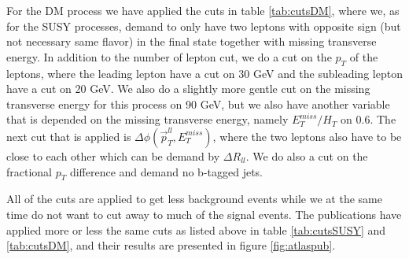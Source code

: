 For the DM process we have applied the cuts in table \ref{tab:cutsDM}, where we, as for the SUSY processes, demand to only have two leptons with opposite sign (but not necessary same flavor) in the final state together with missing transverse energy. In addition to the number of lepton cut, we do a cut on the $p_T$ of the leptons, where the leading lepton have a cut on 30 GeV and the subleading lepton have a cut on 20 GeV. We also do a slightly more gentle cut on the missing transverse energy for this process on 90 GeV, but we also have another variable that is depended on the missing transverse energy, namely $E_T^{miss}/H_T$ on 0.6. The next cut that is applied is $\Delta \phi (\Vec{p}_T^{ll}, E_T^{miss})$, where the two leptons also have to be close to each other which can be demand by $\Delta R_{ll}$. We do also a cut on the fractional $p_T$ difference and demand no b-tagged jets. 

All of the cuts are applied to get less background events while we at the same time do not want to cut away to much of the signal events. The publications have applied more or less the same cuts as listed above in table \ref{tab:cutsSUSY} and \ref{tab:cutsDM}, and their results are presented in figure \ref{fig:atlaspub}.



